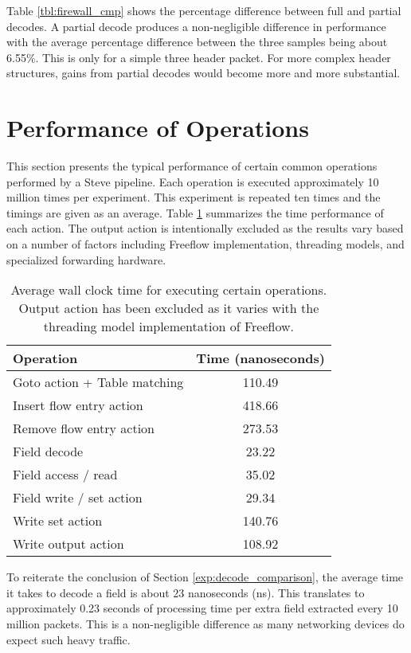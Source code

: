 Table \ref{tbl:firewall_cmp} shows the percentage difference between full and partial decodes. A partial decode produces a non-negligible difference in performance with the average percentage difference between the three samples being about 6.55\%. This is only for a simple three header packet. For more complex header structures, gains from partial decodes would become more and more substantial.


\section{Performance of Operations} \label{exp:action_performance}

This section presents the typical performance of certain common operations performed by a Steve pipeline. Each operation is executed approximately 10 million times per experiment. This experiment is repeated ten times and the timings are given as an average. Table \ref{tbl:action_stats} summarizes the time performance of each action. The output action is intentionally excluded as the results vary based on a number of factors including Freeflow implementation, threading models, and specialized forwarding hardware.

\begin{table}[ht]
\caption{Average wall clock time for executing certain operations. Output action has been excluded as it varies with the threading model implementation of Freeflow.}
\begin{center}
\begin{tabularx}{\linewidth}{| X || c | }
\hline
Operation & Time (nanoseconds)  \\
\hline
Goto action + Table matching & 110.49 \\
\hline
Insert flow entry action & 418.66 \\
\hline
Remove flow entry action & 273.53 \\
\hline
Field decode & 23.22 \\
\hline
Field access / read & 35.02 \\
\hline
Field write / set action & 29.34 \\
\hline
Write set action &  140.76 \\
\hline
Write output action & 108.92 \\
\hline
\end{tabularx}
\end{center}
\label{tbl:action_stats}
\end{table}

To reiterate the conclusion of Section \ref{exp:decode_comparison}, the average time it takes to decode a field is about 23 nanoseconds (ns). This translates to approximately 0.23 seconds of processing time per extra field extracted every 10 million packets. This is a non-negligible difference as many networking devices do expect such heavy traffic.

